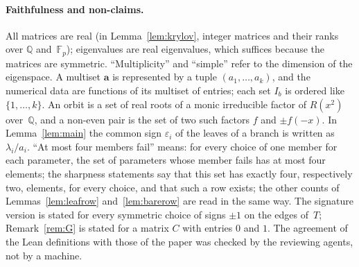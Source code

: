\documentclass[11pt]{article}
\numberwithin{equation}{section}
\theoremstyle{remark}
\newcommand{\Q}{\mathbb Q}
\newcommand{\F}{\mathbb F}
\newcommand{\bfa}{\mathbf a}
\begin{document}
\paragraph{Faithfulness and non-claims.}
All matrices are real (in Lemma~\ref{lem:krylov}, integer matrices and their
ranks over $\Q$ and~$\F_p$); eigenvalues are real eigenvalues, which suffices
because the matrices are symmetric. ``Multiplicity'' and ``simple'' refer to the
dimension of the eigenspace. A multiset $\bfa$ is represented by a tuple
$(a_1,\dots,a_k)$, and the numerical data are functions of its multiset of
entries; each set $I_b$ is ordered like $\{1,\dots,k\}$. An orbit is a set of
real roots of a monic irreducible factor of $R(x^2)$ over~$\Q$, and a non-even
pair is the set of two such factors $f$ and $\pm f(-x)$. In Lemma~\ref{lem:main}
the common sign $\varepsilon_i$ of the leaves of a branch is written as
$\lambda_i/a_i$. ``At most four members fail'' means: for every choice of one
member for each parameter, the set of parameters whose member fails has at most
four elements; the sharpness statements say that this set has exactly four,
respectively two, elements, for every choice, and that such a row exists; the
other counts of Lemmas~\ref{lem:leafrow} and~\ref{lem:barerow} are read in the
same way. The signature version is stated
for every symmetric choice of signs $\pm1$ on the edges of~$T$; Remark~\ref{rem:G}
is stated for a matrix $C$ with entries $0$ and $1$. The agreement of the Lean
definitions with those of the paper was checked by the reviewing agents, not by
a machine.
\end{document}

